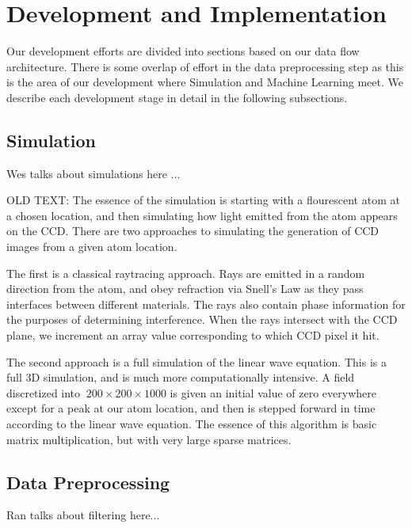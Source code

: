 \section{Development and Implementation}
\label{development}

Our development efforts are divided into sections based on our data flow architecture.  There is some overlap of effort in the data preprocessing step as this is the area of our development where Simulation and Machine Learning meet.  We describe each development stage in detail in the following subsections.

\subsection{Simulation}

Wes talks about simulations here ...

OLD TEXT:
The essence of the simulation is starting with a flourescent atom at a chosen location, and then simulating how light emitted from the atom appears on the CCD. There are two approaches to simulating the generation of CCD images from a given atom location.

The first is a classical raytracing approach. Rays are emitted in a random direction from the atom, and obey refraction via Snell's Law as they pass interfaces between different materials. The rays also contain phase information for the purposes of determining interference. When the rays intersect with the CCD plane, we increment an array value corresponding to which CCD pixel it hit.

The second approach is a full simulation of the linear wave equation. This is a full 3D simulation, and is much more computationally intensive. A field discretized into $~200\times 200\times 1000$ is given an initial value of zero everywhere except for a peak at our atom location, and then is stepped forward in time according to the linear wave equation. The essence of this algorithm is basic matrix multiplication, but with very large sparse matrices.

\subsection{Data Preprocessing}

Ran talks about filtering here...

